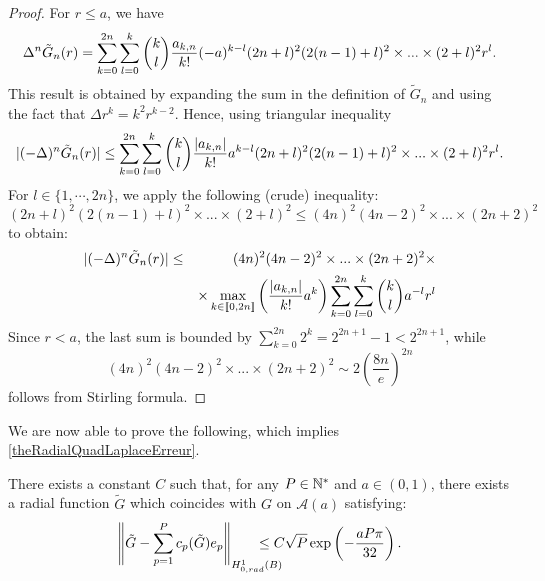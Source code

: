 \documentclass{article}
\begin{document}
\begin{proof} For $r \leq a$, we have
	\[\Delta^n \tilde{G}_n(r) = \sum_{k=0}^{2n}\sum_{l=0}^k \dbinom{k}{l}\dfrac{a_{k,n}}{k!}(-a)^{k-l}(2n+l)^2 (2(n-1)+l)^2\times ... \times (2+l)^2 r^{l}.\]
	This result is obtained by expanding the sum in the definition of $\tilde{G}_n$ and using the fact that $\Delta r^k = k^2r^{k-2}$. Hence, using triangular inequality
	\[|(-\Delta)^n \tilde{G}_n(r)| \leq \sum_{k=0}^{2n}\sum_{l=0}^k \dbinom{k}{l}\dfrac{|a_{k,n}|}{k!}a^{k-l}(2n+l)^2(2(n-1)+l)^2\times ... \times (2+l)^2r^{l}.\]	
	For $l\in \{1,\cdots,2n\}$, we apply the following (crude) inequality:
	\begin{equation}
		(2n+l)^2(2(n-1)+l)^2\times ... \times (2+l)^2 \leq (4n)^2(4n-2)^2 \times ... \times (2n+2)^2
		\label{estimationTresGrossiere}
	\end{equation}
	to obtain: 
	\begin{eqnarray*}		
		|(-\Delta)^n \tilde{G}_n(r)| &\leq& (4n)^2(4n-2)^2 \times ... \times (2n+2)^2\times\\
		&&\times\max_{k\in\llbracket 0,2n\rrbracket}\left(\dfrac{|a_{k,n}|}{k!}a^k\right)\sum_{k=0}^{2n}\sum_{l=0}^k \dbinom{k}{l}a^{-l}r^l	
	\end{eqnarray*}
	Since $r<a$, the last sum is bounded by $\displaystyle\sum_{k=0}^{2n}2^k = 2^{2n+1}-1 < 2^{2n+1}$,
	while 
	\[(4n)^2(4n-2)^2\times...\times (2n+2)^2 \sim 2\left(\dfrac{8n}{e}\right)^{2n}\]
	follows from Stirling formula. 
	
\end{proof}
We are now able to prove the following, which implies \autoref{theRadialQuadLaplaceErreur}.
\begin{Theorem}
	\label{The:DecroissanceErreurProlongementPoly}
	There exists a constant $C$ such that, for any $P \in \mathbb{N}^*$ and $a \in (0,1)$, there exists a radial function $\tilde{G}$ which coincides with $G$ on $\mathcal{A}(a)$ satisfying:
	\[\norm{\tilde{G} - \sum_{p=1}^{P}c_p(\tilde{G})e_p}_{\Hzrad} \hspace{-0.7cm}\leq C \sqrt{P} \exp\left(-\frac{aP\pi}{32}\right).\]
							
\end{Theorem}
\end{document}
